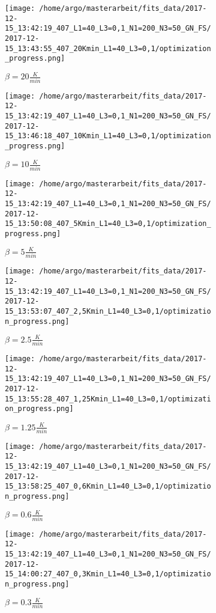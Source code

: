 \documentclass{scrartcl}[12pt, halfparskip]
\numberwithin{equation}{section}
\numberwithin{figure}{section}
\numberwithin{table}{section}
\begin{document}
\begin{figure}[H]
	\begin{subfigure}{0.32\textwidth}
		\texttt{[image: /home/argo/masterarbeit/fits\_data/2017-12-15\_13:42:19\_407\_L1=40\_L3=0,1\_N1=200\_N3=50\_GN\_FS/2017-12-15\_13:43:55\_407\_20Kmin\_L1=40\_L3=0,1/optimization\_progress.png]}
		\caption{$\beta = 20 \frac{K}{min}$}
	\end{subfigure}
	\begin{subfigure}{0.32\textwidth}
		\texttt{[image: /home/argo/masterarbeit/fits\_data/2017-12-15\_13:42:19\_407\_L1=40\_L3=0,1\_N1=200\_N3=50\_GN\_FS/2017-12-15\_13:46:18\_407\_10Kmin\_L1=40\_L3=0,1/optimization\_progress.png]}
		\caption{$\beta = 10 \frac{K}{min}$}
	\end{subfigure}
	\begin{subfigure}{0.32\textwidth}
		\texttt{[image: /home/argo/masterarbeit/fits\_data/2017-12-15\_13:42:19\_407\_L1=40\_L3=0,1\_N1=200\_N3=50\_GN\_FS/2017-12-15\_13:50:08\_407\_5Kmin\_L1=40\_L3=0,1/optimization\_progress.png]}
		\caption{$\beta = 5 \frac{K}{min}$}
	\end{subfigure}
	\begin{subfigure}{0.32\textwidth}
		\texttt{[image: /home/argo/masterarbeit/fits\_data/2017-12-15\_13:42:19\_407\_L1=40\_L3=0,1\_N1=200\_N3=50\_GN\_FS/2017-12-15\_13:53:07\_407\_2,5Kmin\_L1=40\_L3=0,1/optimization\_progress.png]}
		\caption{$\beta = 2.5 \frac{K}{min}$}
	\end{subfigure}
	\begin{subfigure}{0.32\textwidth}
		\texttt{[image: /home/argo/masterarbeit/fits\_data/2017-12-15\_13:42:19\_407\_L1=40\_L3=0,1\_N1=200\_N3=50\_GN\_FS/2017-12-15\_13:55:28\_407\_1,25Kmin\_L1=40\_L3=0,1/optimization\_progress.png]}
		\caption{$\beta = 1.25 \frac{K}{min}$}
	\end{subfigure}
	\begin{subfigure}{0.32\textwidth}
		\texttt{[image: /home/argo/masterarbeit/fits\_data/2017-12-15\_13:42:19\_407\_L1=40\_L3=0,1\_N1=200\_N3=50\_GN\_FS/2017-12-15\_13:58:25\_407\_0,6Kmin\_L1=40\_L3=0,1/optimization\_progress.png]}
		\caption{$\beta = 0.6 \frac{K}{min}$}
	\end{subfigure}
	\begin{subfigure}{0.32\textwidth}
		\texttt{[image: /home/argo/masterarbeit/fits\_data/2017-12-15\_13:42:19\_407\_L1=40\_L3=0,1\_N1=200\_N3=50\_GN\_FS/2017-12-15\_14:00:27\_407\_0,3Kmin\_L1=40\_L3=0,1/optimization\_progress.png]}
		\caption{$\beta = 0.3 \frac{K}{min}$}
	\end{subfigure}
	\caption{}
	\label{fig:optimization_progress_FS}
\end{figure}
\end{document}
